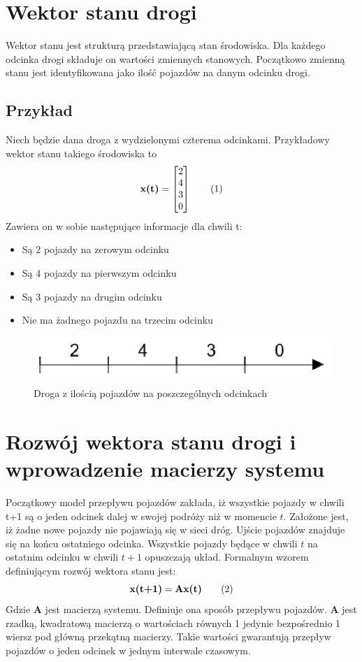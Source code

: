 \documentclass[12pt]{book}
\theoremstyle{plain}
\newcommand\addtag{\refstepcounter{equation}
\renewcommand{\labelenumii}{\theenumii}
\renewcommand{\theenumii}{\theenumi.\arabic{enumii}.}
\tag{\theequation}}
\begin{document}
\section{Wektor stanu drogi} \label{sec:wektor_stanu_drogi}
Wektor stanu jest strukturą przedstawiającą stan środowiska. Dla każdego odcinka drogi składuje on wartości zmiennych stanowych. Początkowo zmienną stanu jest identyfikowana jako ilość pojazdów na danym odcinku drogi. 
\subsection{Przykład} \label{subsec:example-single-road}
Niech będzie dana droga z wydzielonymi czterema odcinkami. Przykładowy wektor stanu takiego środowiska to
\[\textbf{x(t)}=\begin{bmatrix}
2 \\ 4 \\ 3 \\ 0
\end{bmatrix} \addtag \]
Zawiera on w sobie następujące informacje dla chwili t:
\begin{itemize}
	\item Są 2 pojazdy na zerowym odcinku
	\item Są 4 pojazdy na pierwszym odcinku
	\item Są 3 pojazdy na drugim odcinku
	\item Nie ma żadnego pojazdu na trzecim odcinku
\end{itemize}

\begin{figure}[H]
	\centering
	\includegraphics[width=14cm]{images/1_droga_4_odcinki}
	\caption{Droga z ilością pojazdów na poszczególnych odcinkach}
	\label{fig:single_road}
\end{figure}
\section{Rozwój wektora stanu drogi i wprowadzenie macierzy systemu}
Początkowy model przepływu pojazdów zakłada, iż wszystkie pojazdy w chwili t+1 są o jeden odcinek dalej w swojej podróży niż w momencie $t$. Założone jest, iż żadne nowe pojazdy nie pojawiają się w sieci dróg. Ujście pojazdów znajduje się na końcu ostatniego odcinka. Wszystkie pojazdy będące w chwili $t$ na ostatnim odcinku w chwili $t+1$ opuszczają układ. Formalnym wzorem definiującym rozwój wektora stanu jest:
\[\textbf{x(t+1)}=\textbf{Ax(t)} \addtag \label{eq:single_road} \]
Gdzie $\textbf{A}$ jest macierzą systemu. Definiuje ona sposób przepływu pojazdów. $\textbf{A}$ jest rzadką, kwadratową macierzą o wartościach równych 1 jedynie bezpośrednio 1 wiersz pod główną przekątną macierzy. Takie wartości gwarantują przepływ pojazdów o jeden odcinek w jednym interwale czasowym.
\end{document}
